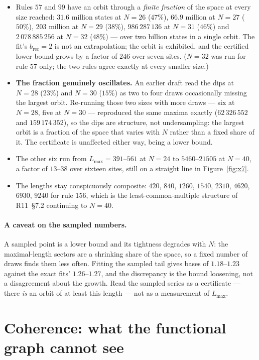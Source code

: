 \documentclass[11pt]{article}
\newcommand{\rec}{\mathrm{rec}}
\theoremstyle{plain}
\theoremstyle{definition}
\begin{document}
\begin{itemize}
\item Rules $57$ and $99$ have an orbit through a \emph{finite fraction} of the
  space at every size reached: $31.6$ million states at $N=26$ ($47\%$),
  $66.9$ million at $N=27$ ($50\%$), $203$ million at $N=29$ ($38\%$),
  $986\,287\,136$ at $N=31$ ($46\%$) and $2\,078\,885\,256$ at $N=32$ ($48\%$)
  --- over two billion states in a single orbit. The fit's $b_\rec=2$ is not an
  extrapolation; the orbit is exhibited, and the certified lower bound grows by a
  factor of $246$ over seven sites. ($N=32$ was run for rule $57$ only; the two
  rules agree exactly at every smaller size.)
\item \textbf{The fraction genuinely oscillates.} An earlier draft read the dips
  at $N=28$ ($23\%$) and $N=30$ ($15\%$) as two to four draws occasionally
  missing the largest orbit. Re-running those two sizes with more draws --- six
  at $N=28$, five at $N=30$ --- reproduced the same maxima exactly
  ($62\,326\,552$ and $159\,174\,352$), so the dips are structure, not
  undersampling: the largest orbit is a fraction of the space that varies with
  $N$ rather than a fixed share of it. The certificate is unaffected either way,
  being a lower bound.
\item The other six run from $L_{\max}=391$--$561$ at $N=24$ to $5460$--$21505$ at
  $N=40$, a factor of $13$--$38$ over sixteen sites, still on a straight line in
  Figure~\ref{fig:x7}.
\item The lengths stay conspicuously composite: $420$, $840$, $1260$, $1540$,
  $2310$, $4620$, $6930$, $9240$ for rule $156$, which is the least-common-multiple
  structure of R11~\S7.2 continuing to $N=40$.
\end{itemize}

\paragraph{A caveat on the sampled numbers.} A sampled point is a lower bound and
its tightness degrades with $N$: the maximal-length sectors are a shrinking share
of the space, so a fixed number of draws finds them less often. Fitting the
sampled tail gives bases of $1.18$--$1.23$ against the exact fits' $1.26$--$1.27$,
and the discrepancy is the bound loosening, not a disagreement about the growth.
Read the sampled series as a certificate --- there \emph{is} an orbit of at least
this length --- not as a measurement of $L_{\max}$.

\section{Coherence: what the functional graph cannot see}
\label{sec:coherence}
\end{document}
